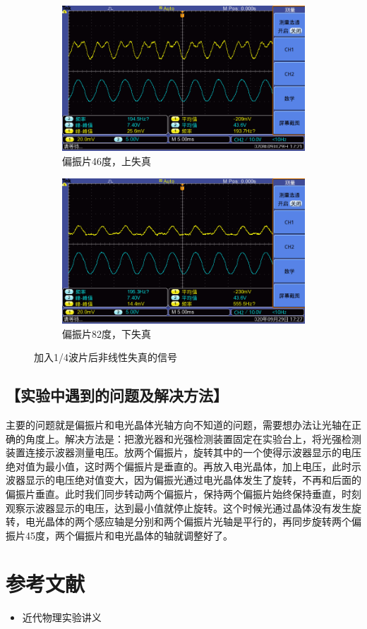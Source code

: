 \documentclass{ctexart}
\let\oldsubsection\subsection
\renewcommand{\subsection}[1]{\oldsubsection{\!\!\!\!\!\!【#1】}}
\begin{document}
\begin{figure}[H]
  \centering
  \begin{subfigure}{.48\textwidth}
    \centering
    \includegraphics[width=\linewidth]{晶体电光调制图像/有波片/上失真484V46度/F0000TEK}
    \caption{偏振片46度，上失真}
  \end{subfigure}
  \begin{subfigure}{.48\textwidth}
    \centering
    \includegraphics[width=\linewidth]{晶体电光调制图像/有波片/下失真484V82度/F0000TEK}
    \caption{偏振片82度，下失真}
  \end{subfigure}
  \caption{加入1/4波片后非线性失真的信号}
\end{figure}

\subsection{实验中遇到的问题及解决方法}

主要的问题就是偏振片和电光晶体光轴方向不知道的问题，需要想办法让光轴在正确的角度上。解决方法是：把激光器和光强检测装置固定在实验台上，将光强检测装置连接示波器测量电压。放两个偏振片，旋转其中的一个使得示波器显示的电压绝对值为最小值，这时两个偏振片是垂直的。再放入电光晶体，加上电压，此时示波器显示的电压绝对值变大，因为偏振光通过电光晶体发生了旋转，不再和后面的偏振片垂直。此时我们同步转动两个偏振片，保持两个偏振片始终保持垂直，时刻观察示波器显示的电压，达到最小值就停止旋转。这个时候光通过晶体没有发生旋转，电光晶体的两个感应轴是分别和两个偏振片光轴是平行的，再同步旋转两个偏振片45度，两个偏振片和电光晶体的轴就调整好了。

\section{参考文献}
\begin{itemize}[leftmargin=0pt]
  \item[] 近代物理实验讲义
\end{itemize}
\end{document}
